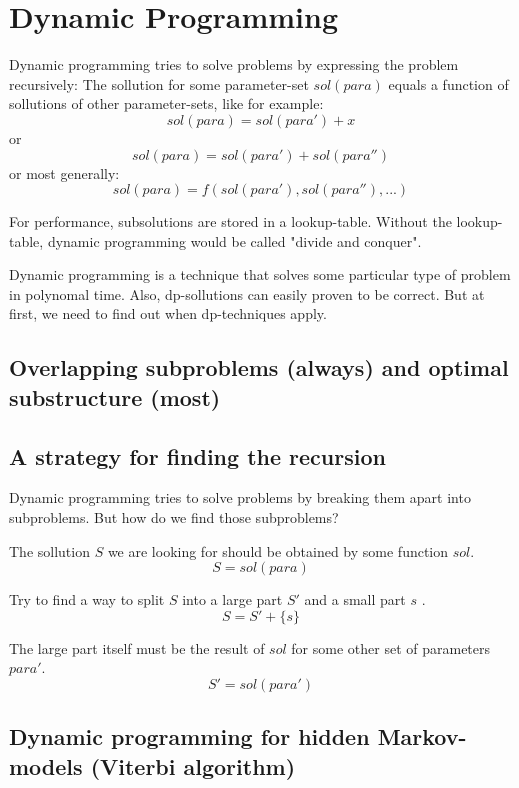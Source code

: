 \section{Dynamic Programming}

Dynamic programming tries to solve problems by expressing the problem recursively: The sollution for some parameter-set $sol(para)$ equals a function of sollutions of other parameter-sets, like for example: 
$$ sol(para) = sol(para') + x$$
or
$$ sol(para) = sol(para') + sol(para'')$$
or most generally:
$$ sol(para) = f(sol(para'), sol(para''), ...)$$

For performance, subsolutions are stored in a lookup-table. Without the lookup-table, dynamic programming would be called "divide and conquer".


Dynamic programming is a technique that solves some particular type of problem in polynomal time. Also, dp-sollutions can easily proven to be correct. But at first, we need to find out when dp-techniques apply. 

\subsection{Overlapping subproblems (always) and optimal substructure (most)}



\subsection{A strategy for finding the recursion}

Dynamic programming tries to solve problems by breaking them apart into subproblems. But how do we find those subproblems?

The sollution $S$ we are looking for should be obtained by some function $sol$.
$$ S = sol(para) $$

Try to find a way to split $S$ into a large part $S'$ and a small part $s$ .
$$ S = S' + \{ s \} $$

The large part itself must be the result of $sol$ for some other set of parameters $para'$.
$$ S' = sol(para') $$


\subsection{Dynamic programming for hidden Markov-models (Viterbi algorithm)}
